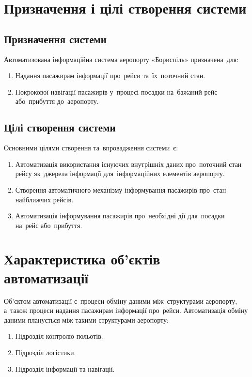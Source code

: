 \documentclass[
	a4paper,
	oneside,
	BCOR = 10mm,
	DIV = 12,
	12pt,
	headings = normal,
]{scrartcl}
\begin{document}
	\section{Призначення і цілі створення системи}
		\subsection{Призначення системи}
			Автоматизована інформаційна система аеропорту «Бориспіль» призначена~для:
			\begin{enumerate}[noitemsep]
				\item Надання пасажирам інформації про~рейси та~їх~поточний стан.
				\item Покрокової навігації пасажирів у~процесі посадки на~бажаний рейс або~прибуття до~аеропорту. 
			\end{enumerate}

			\subsection{Цілі створення системи}
				Основними цілями створення та~впровадження системи~є:
				\begin{enumerate}[noitemsep]
					\item Автоматизація використання існуючих внутрішніх даних про~поточний стан рейсу як~джерела інформації для~інформаційних елементів аеропорту.
					\item Створення автоматичного механізму інформування пасажирів про~стан найближчих рейсів.
					\item Автоматизація інформування пасажирів про~необхідні дії для~посадки на~рейс або~прибуття.
				\end{enumerate}

	\section{Характеристика об'єктів автоматизації}
		Об'єктом автоматизації є~процеси обміну даними між~структурами аеропорту, а~також процеси надання пасажирам інформації про~рейси. Автоматизація обміну даними планується між такими структурами аеропорту:
		\begin{enumerate}[noitemsep]
			\item Підрозділ контролю польотів.
			\item Підрозділ логістики.
			\item Підрозділ інформації та навігації.
		\end{enumerate}
\end{document}
